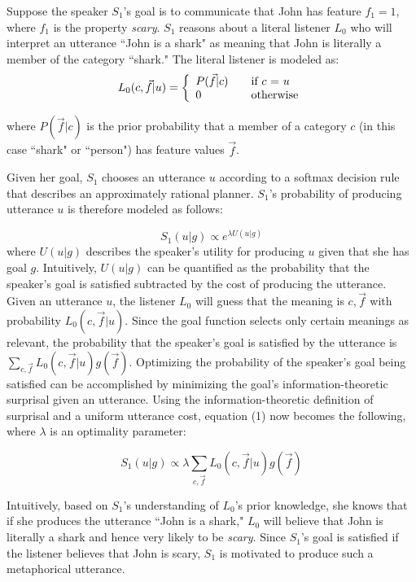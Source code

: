 \documentclass[10pt,letterpaper]{article}
\begin{document}
Suppose the speaker $S_1$'s goal is to communicate that John has feature $f_1 =1$, where $f_1$ is the property \emph{scary}. $S_1$ reasons about a literal listener $L_0$ who will interpret an utterance ``John is a shark" as meaning that John is literally a member of the category ``shark." The literal listener is modeled as:
\[ L_0(c, \vec f |u) = \left\{ 
  \begin{array}{l l}
    P(\vec f | c) & \quad \text{if $c$ = $u$}\\
    0 & \quad \text{otherwise}
  \end{array} \right.\]

where $P(\vec f | c)$ is the prior probability that a member of a category $c$ (in this case ``shark" or 	``person") has feature values $\vec f$.

Given her goal, $S_1$ chooses an utterance $u$ according to a softmax decision rule that describes an approximately rational planner. $S_1$'s probability of producing utterance $u$ is therefore modeled as follows: \cite{sutton1998reinforcement}

\begin{equation}
S_1(u | g) \propto e^{\lambda U(u |  g)}
\end{equation}
where $U(u | g)$ describes the speaker's utility for producing $u$ given that she has goal $g$. Intuitively, $U(u |  g)$ can be quantified as the probability that the speaker's goal is satisfied subtracted by the cost of producing the utterance. Given an utterance $u$, the listener $L_0$ will guess that the meaning is $c, \vec f$ with probability $L_0 (c, \vec f|u)$. Since the goal function selects only certain meanings as relevant, the probability that the speaker's goal is satisfied by the utterance is $
\sum_{c, \vec f}{L_0 (c, \vec f|u) g(\vec f)}$. Optimizing the probability of the speaker's goal being satisfied can be accomplished by minimizing the goal's information-theoretic surprisal given an utterance. Using the information-theoretic definition of surprisal and a uniform utterance cost, equation (1) now becomes the following, where $\lambda$ is an optimality parameter:

\begin{equation}
S_1 (u | g) \propto \lambda \sum_{c,\vec f}{L_0 (c,\vec f|u) g(\vec f)}
\end{equation}

Intuitively, based on $S_1$'s understanding of $L_0$'s prior knowledge, she knows that if she produces the utterance ``John is a shark," $L_0$ will believe that John is literally a shark and hence very likely to be \emph{scary}. Since $S_1$'s goal is satisfied if the listener believes that John is scary, $S_1$ is motivated to produce such a metaphorical utterance. %
\end{document}
